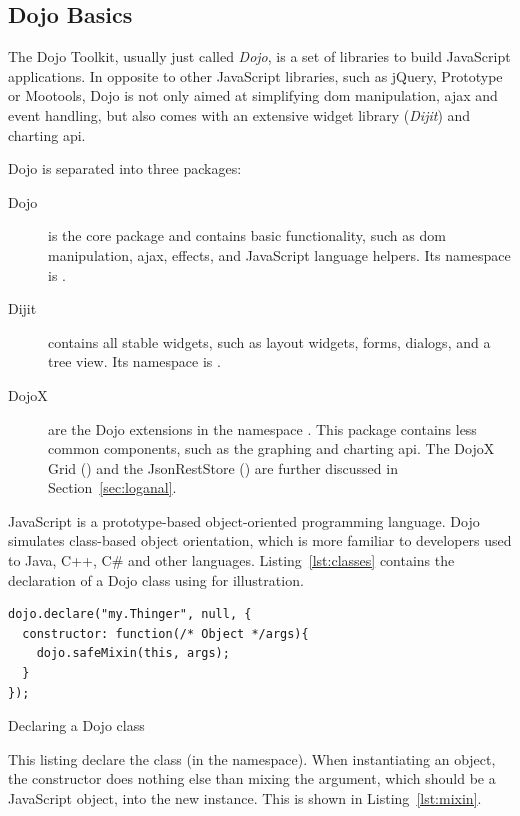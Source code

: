 \subsection{Dojo Basics}
The Dojo Toolkit, usually just called \emph{Dojo}, is a set of libraries to build JavaScript applications. In opposite to other JavaScript libraries, such as jQuery, Prototype or Mootools, Dojo is not only aimed at simplifying \ac{dom} manipulation, \ac{ajax} and event handling, but also comes with an extensive widget library (\emph{Dijit}) and charting \ac{api}.

Dojo is separated into three packages:
\begin{description}
	\item[Dojo] is the core package and contains basic functionality, such as \ac{dom} manipulation, \ac{ajax}, effects, and JavaScript language helpers. Its namespace is .
	\item[Dijit] contains all stable widgets, such as layout widgets, forms, dialogs, and a tree view. Its namespace is .
	\item[DojoX] are the Dojo extensions in the namespace . This package contains less common components, such as the graphing and charting \ac{api}. The DojoX Grid () and the JsonRestStore () are further discussed in Section~\ref{sec:loganal}.
\end{description}

JavaScript is a prototype-based object-oriented programming language. Dojo simulates class-based object orientation, which is more familiar to developers used to Java, C++, C\# and other languages. Listing~\ref{lst:classes} contains the declaration of a Dojo class using  for illustration.

\begin{listing}[H]
\begin{verbatim}
dojo.declare("my.Thinger", null, {
  constructor: function(/* Object */args){
    dojo.safeMixin(this, args);
  }
});
\end{verbatim}
\caption{Declaring a Dojo class}
\label{lst:classes}
\end{listing}

This listing declare the  class (in the  namespace). When instantiating an object, the constructor does nothing else than mixing the  argument, which should be a JavaScript object, into the new instance. This is shown in Listing~\ref{lst:mixin}.

